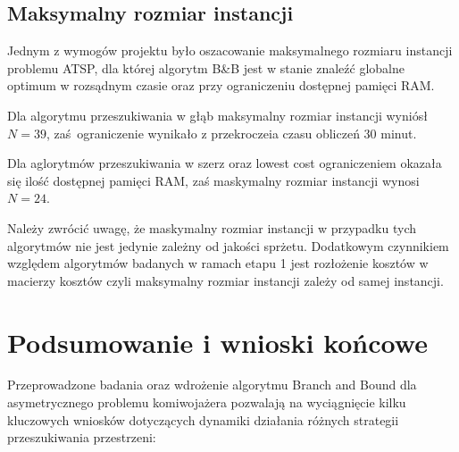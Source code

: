 \documentclass[12pt, a4paper]{article}
\begin{document}
\subsection{Maksymalny rozmiar instancji}
Jednym z wymogów projektu było oszacowanie maksymalnego rozmiaru instancji problemu ATSP, dla której algorytm B\&B jest w stanie znaleźć globalne optimum w rozsądnym czasie oraz przy ograniczeniu dostępnej pamięci RAM. 

Dla algorytmu przeszukiwania w głąb maksymalny rozmiar instancji wyniósł $N=39$, zaś ograniczenie wynikało z przekroczeia czasu obliczeń 30 minut.

Dla aglorytmów przeszukiwania w szerz oraz lowest cost ograniczeniem okazała się ilość dostępnej pamięci RAM, zaś maskymalny rozmiar instancji wynosi $N=24$.

Należy zwrócić uwagę, że maskymalny rozmiar instancji w przypadku tych algorytmów nie jest jedynie zależny od jakości sprżetu. Dodatkowym czynnikiem względem algorytmów badanych w ramach etapu 1 jest rozłożenie kosztów w macierzy kosztów czyli maksymalny rozmiar instancji zależy od samej instancji.


\section{Podsumowanie i wnioski końcowe}

Przeprowadzone badania oraz wdrożenie algorytmu Branch and Bound dla asymetrycznego problemu komiwojażera pozwalają na wyciągnięcie kilku kluczowych wniosków dotyczących dynamiki działania różnych strategii przeszukiwania przestrzeni:
\end{document}
